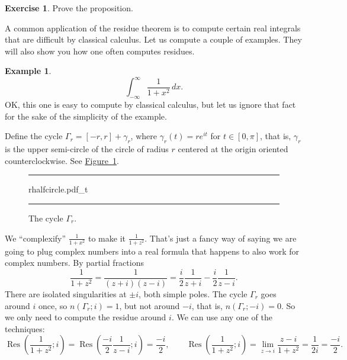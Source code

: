 \documentclass[12pt,openany]{book}
\newcommand{\myquote}[1]{``#1''}
\theoremstyle{plain}
\theoremstyle{remark}
\theoremstyle{definition}
\newenvironment{exbox}{%
    \def\FrameCommand{\vrule width 1pt \relax\hspace{10pt}}%
    \MakeFramed{\advance\hsize-\width\FrameRestore}%
}{%
    \endMakeFramed
}
\newenvironment{myfig}{%
\begin{figure}[h!t]
\noindent\rule{\textwidth}{0.5pt}\vspace{12pt}\par\centering}%
{\par\noindent\rule{\textwidth}{0.5pt}
\end{figure}}
\theoremstyle{exercise}
\newtheorem{exercise}{Exercise}[section]
\theoremstyle{example}
\newtheorem{example}[thm]{Example}
\newcommand{\figureref}[1]{\hyperref[#1]{Figure~\ref*{#1}}}
\begin{document}
\begin{exbox}
\begin{exercise}
Prove the proposition.
\end{exercise}
\end{exbox}

A common application of the residue theorem is to compute certain real
integrals that are difficult by classical calculus.  Let us compute
a couple of examples.  They will also show you how one often computes
residues.

\begin{example}
\begin{equation*}
\int_{-\infty}^\infty \frac{1}{1+x^2} \, dx .
\end{equation*}
OK\@, this one is easy to compute by classical calculus, but let us ignore
that fact for the sake of the simplicity of the example.

Define the cycle $\Gamma_r = [-r,r] + \gamma_r$, where $\gamma_r(t) =
re^{it}$ for $t \in [0,\pi]$, that is, $\gamma_r$ is the upper semi-circle
of the circle of radius $r$ centered at the origin oriented counterclockwise.
See \figureref{fig:rhalfcircle}.

\begin{myfig}
{rhalfcircle.pdf_t}
\caption{The cycle $\Gamma_r$.\label{fig:rhalfcircle}}
\end{myfig}

We \myquote{complexify}
$\frac{1}{1+x^2}$ to make it $\frac{1}{1+z^2}$.
That's just a fancy way of saying we are going to plug complex numbers
into a real formula that happens to also work for complex numbers.
By partial fractions
\begin{equation*}
\frac{1}{1+z^2} = \frac{1}{(z+i)(z-i)} =
\frac{i}{2} \frac{1}{z+i} - 
\frac{i}{2} \frac{1}{z-i} .
\end{equation*}
There are isolated singularities at $\pm i$, both simple poles.  The cycle
$\Gamma_r$ goes around $i$ once, so $n(\Gamma_r;i) = 1$,
but not around $-i$, that is, $n(\Gamma_r;-i) = 0$.
So we only need to compute
the residue around $i$.  We can use any one of the techniques:
\begin{equation*}
\operatorname{Res}\left(\frac{1}{1+z^2};i\right) =
\operatorname{Res}\left(
\frac{-i}{2} \frac{1}{z-i};
i\right) = \frac{-i}{2} ,
\qquad
\operatorname{Res}\left(\frac{1}{1+z^2};i\right) =
\lim_{z \to i} \frac{z-i}{1+z^2}
=
\frac{1}{2i} = \frac{-i}{2}.
\end{equation*}


\end{example}
\end{document}
